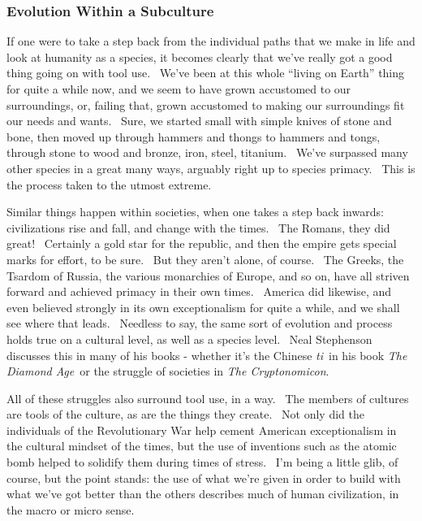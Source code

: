 \subsubsection{Evolution Within a
Subculture}\label{evolution-within-a-subculture}

If one were to take a step back from the individual paths that we make
in life and look at humanity as a species, it becomes clearly that we've
really got a good thing going on with tool use. ~We've been at this
whole ``living on Earth'' thing for quite a while now, and we seem to
have grown accustomed to our surroundings, or, failing that, grown
accustomed to making our surroundings fit our needs and wants. ~Sure, we
started small with simple knives of stone and bone, then moved up
through hammers and thongs to hammers and tongs, through stone to wood
and bronze, iron, steel, titanium. ~We've surpassed many other species
in a great many ways, arguably right up to species primacy. ~This is the
process taken to the utmost extreme.

Similar things happen within societies, when one takes a step back
inwards: civilizations rise and fall, and change with the times. ~The
Romans, they did great! ~Certainly a gold star for the republic, and
then the empire gets special marks for effort, to be sure. ~But they
aren't alone, of course. ~The Greeks, the Tsardom of Russia, the various
monarchies of Europe, and so on, have all striven forward and achieved
primacy in their own times. ~America did likewise, and even believed
strongly in its own exceptionalism for quite a while, and we shall see
where that leads. ~Needless to say, the same sort of evolution and
process holds true on a cultural level, as well as a species level.
~Neal Stephenson discusses this in many of his books - whether it's the
Chinese \emph{ti}~in his book \emph{The Diamond Age}~or the struggle of
societies in \emph{The Cryptonomicon}.

All of these struggles also surround tool use, in a way. ~The members of
cultures are tools of the culture, as are the things they create. ~Not
only did the individuals of the Revolutionary War help cement American
exceptionalism in the cultural mindset of the times, but the use of
inventions such as the atomic bomb helped to solidify them during times
of stress. ~I'm being a little glib, of course, but the point stands:
the use of what we're given in order to build with what we've got better
than the others describes much of human civilization, in the macro or
micro sense.

